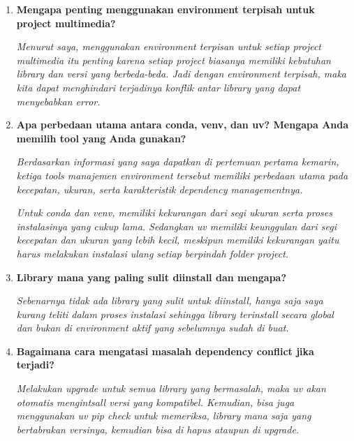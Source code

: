 \documentclass[11pt,a4paper]{article}
\begin{document}
\begin{enumerate}
    \item \textbf{Mengapa penting menggunakan environment terpisah untuk project multimedia?}
    
    \textit{Menurut saya, menggunakan environment terpisan untuk setiap project multimedia itu penting karena setiap project biasanya memiliki kebutuhan library dan versi yang berbeda-beda. Jadi dengan environment terpisah, maka kita dapat menghindari terjadinya konflik antar library yang dapat menyebabkan error.}
    
    \item \textbf{Apa perbedaan utama antara conda, venv, dan uv? Mengapa Anda memilih tool yang Anda gunakan?}
    
    \textit{Berdasarkan informasi yang saya dapatkan di pertemuan pertama kemarin, 
    ketiga tools manajemen environment tersebut memiliki perbedaan utama pada kecepatan, ukuran, serta karakteristik dependency managementnya.}

    \textit{Untuk conda dan venv, memiliki kekurangan dari segi ukuran serta proses instalasinya yang cukup lama. 
    Sedangkan uv memiliki keunggulan dari segi kecepatan dan ukuran yang lebih kecil, meskipun memiliki kekurangan yaitu harus melakukan instalasi ulang setiap berpindah folder project.}

    \item \textbf{Library mana yang paling sulit diinstall dan mengapa?}
    
    \textit{Sebenarnya tidak ada library yang sulit untuk diinstall, hanya saja saya kurang teliti dalam proses instalasi sehingga library terinstall secara global dan bukan di environment aktif yang sebelumnya sudah di buat.}
    
    \item \textbf{Bagaimana cara mengatasi masalah dependency conflict jika terjadi?}
    
    \textit{Melakukan upgrade untuk semua library yang bermasalah, maka uv akan otomatis mengintsall versi yang kompatibel. Kemudian, bisa juga menggunakan uv pip check untuk memeriksa, library mana saja yang bertabrakan versinya, kemudian bisa di hapus ataupun di upgrade.}
    

\end{enumerate}
\end{document}
